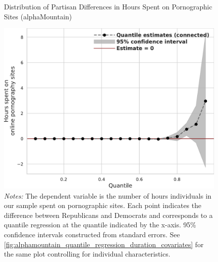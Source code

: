 \documentclass[12pt, letterpaper]{article}
\begin{document}
\begin{figure}[t]
	\centering
	\caption{Distribution of Partisan Differences in Hours Spent on Pornographic Sites (alphaMountain)}
	\includegraphics[width=.7\linewidth]{figs/alphamountain_quantile_reg_duration_adult.pdf}
	\caption*{\footnotesize \emph{Notes:} 
		The dependent variable is the number of hours individuals in our sample spent on pornographic sites.
		Each point indicates the difference between Republicans and Democrats and corresponds to a quantile regression at the quantile indicated by the x-axis.
		95\% confidence intervals constructed from standard errors.
		See \cref{fig:alphamountain_quantile_regression_duration_covariates} for the same plot controlling for individual characteristics.
	}
	\label{fig:alphamountain_quantile_regression_duration}
\end{figure}
\end{document}
